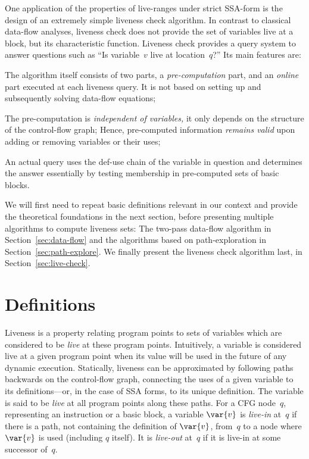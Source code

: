 One application of the properties of live-ranges under strict SSA-form is the design of an extremely simple liveness check algorithm.
In contrast to classical data-flow analyses, liveness check does not provide the set of variables live at a block, but its characteristic function.
Liveness check provides a query system to answer questions such as ``Is variable~$v$ live at location~$q$?''
Its main features are:
\begin{compactenum}
\item
	The algorithm itself consists of two parts, a \emph{pre-computation} part, and an \emph{online} part executed at each liveness query.
	It is not based on setting up and subsequently solving data-flow equations;
\item
	The pre-computation is \emph{independent of variables,} it only depends on the structure of the control-flow graph;
	Hence, pre-computed information \emph{remains valid} upon adding or removing variables or their uses;
\item
	An actual query uses the def-use chain of the variable in question and determines the answer essentially by testing membership in pre-computed sets of basic blocks.
\end{compactenum}

We will first need to repeat basic definitions relevant in our context and provide the theoretical foundations in the next section, before presenting multiple algorithms to compute liveness sets: The two-pass data-flow algorithm in Section~\ref{sec:data-flow} and the algorithms based on path-exploration in Section~\ref{sec:path-explore}.
We finally present the liveness check algorithm last, in Section~\ref{sec:live-check}.

\section{Definitions}
Liveness is a property relating program points to sets of variables which are considered to be \emph{live} at these program points.
Intuitively, a variable is considered live at a given program point when its value will be used in the future of any dynamic execution.
Statically, liveness can be approximated by following paths backwards on the control-flow graph, connecting the uses of a given variable to its definitions---or, in the case of SSA forms, to its unique definition.
The variable is said to be \emph{live} at all program points along these paths.
For a CFG node~$q$, representing an instruction or a basic block, a variable $\var{v}$ is \emph{live-in} at~$q$ if there is a path, not containing the definition of $\var{v}$, from~$q$ to a node where $\var{v}$ is used (including $q$ itself).
It is \emph{live-out} at~$q$ if it is live-in at some successor of~$q$.

